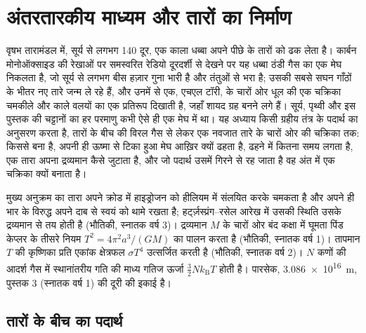 \chapter{अंतरतारकीय माध्यम और तारों का निर्माण}\label{ch:b2:ism-star-formation}

वृषभ तारामंडल में, सूर्य से लगभग \qty{140}{\parsec} दूर, एक काला
धब्बा अपने पीछे के तारों को ढक लेता है। कार्बन मोनोऑक्साइड की रेखाओं पर समस्वरित रेडियो दूरदर्शी से
देखने पर यह धब्बा ठंडी गैस का एक मेघ निकलता है, जो सूर्य से लगभग बीस
हज़ार गुना भारी है और तंतुओं से भरा है; उसकी सबसे सघन
गाँठों के भीतर नए तारे जन्म ले रहे हैं, और उनमें से एक, एचएल टॉरी, के चारों ओर धूल की एक
चक्रिका चमकीले और काले वलयों का एक प्रतिरूप दिखाती है, जहाँ शायद ग्रह बनने लगे
हैं। सूर्य, पृथ्वी और इस पुस्तक की चट्टानों का हर परमाणु कभी
ऐसे ही एक मेघ में था। यह अध्याय किसी ग्रहीय तंत्र के पदार्थ का अनुसरण करता है, तारों के बीच की
विरल गैस से लेकर एक नवजात तारे के चारों ओर की चक्रिका तक:  किससे
बना है, अपनी ही ऊष्मा से टिका हुआ मेघ आख़िर क्यों ढहता है,
ढहने में कितना समय लगता है, एक तारा अपना द्रव्यमान कैसे जुटाता है, और
जो पदार्थ उसमें गिरने से रह जाता है वह अंत में एक चक्रिका क्यों बनाता है।

\begin{recall}
मुख्य अनुक्रम का तारा अपने क्रोड में हाइड्रोजन को हीलियम में संलयित करके चमकता है
और अपने ही भार के विरुद्ध अपने दाब से स्वयं को थामे रखता है;
हर्ट्ज़स्प्रंग--रसेल आरेख में उसकी स्थिति उसके द्रव्यमान से तय होती है (भौतिकी,
स्नातक वर्ष 3)। द्रव्यमान $M$ के चारों ओर बंद कक्षा में घूमता पिंड केप्लर के
तीसरे नियम $T^2 = 4\pi^2 a^3/(GM)$ का पालन करता है (भौतिकी, स्नातक वर्ष 1)। तापमान $T$ की
कृष्णिका प्रति एकांक क्षेत्रफल $\sigma T^4$ उत्सर्जित करती है (भौतिकी, स्नातक
वर्ष 2)। $N$ कणों की आदर्श गैस में स्थानांतरीय गति की माध्य गतिज ऊर्जा
$\tfrac32 N k_{\mathrm B} T$ होती है। पारसेक,
\qty{3.086e16}{m}, पुस्तक 3 (स्नातक वर्ष 1) की दूरी की इकाई है।
\end{recall}

\section{तारों के बीच का पदार्थ}

